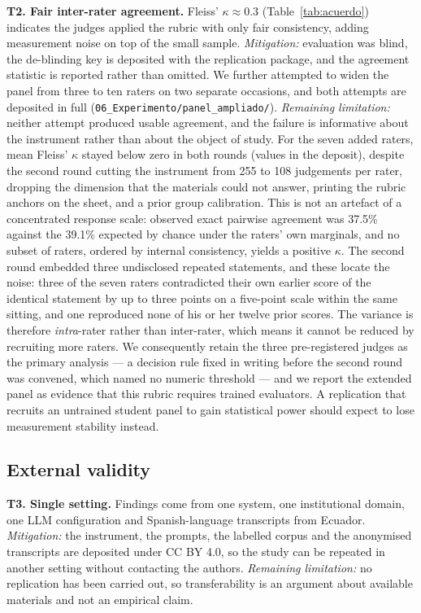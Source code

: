\documentclass{llncs}
\begin{document}
\textbf{T2. Fair inter-rater agreement.} Fleiss' $\kappa \approx 0.3$
(Table~\ref{tab:acuerdo}) indicates the judges applied the rubric with only fair
consistency, adding measurement noise on top of the small sample.
\emph{Mitigation:} evaluation was blind, the de-blinding key is deposited with
the replication package, and the agreement statistic is reported rather than
omitted. We further attempted to widen the panel from three to ten raters on two
separate occasions, and both attempts are deposited in full
(\nolinkurl{06_Experimento/panel_ampliado/}). \emph{Remaining limitation:} neither
attempt produced usable agreement, and the failure is informative about the
instrument rather than about the object of study. For the seven added raters,
mean Fleiss' $\kappa$ stayed below zero in both rounds (values in the deposit),
despite the second round cutting the instrument from 255
to 108 judgements per rater, dropping the dimension that the materials could not
answer, printing the rubric anchors on the sheet, and a prior group calibration. This is not an artefact of a concentrated response
scale: observed exact pairwise agreement was 37.5\% against the 39.1\% expected
by chance under the raters' own marginals, and no subset of raters, ordered by
internal consistency, yields a positive $\kappa$. The second round embedded three
undisclosed repeated statements, and these locate the noise: three of the seven
raters contradicted their own earlier score of the identical statement by up to
three points on a five-point scale within the same sitting, and one reproduced
none of his or her twelve prior scores. The variance is therefore
\emph{intra}-rater rather than inter-rater, which means it cannot be reduced by
recruiting more raters. We consequently retain the three pre-registered judges as
the primary analysis --- a decision rule fixed in writing before the second round
was convened, which named no numeric threshold --- and we report the
extended panel as evidence that this rubric requires trained evaluators. A
replication that recruits an untrained student panel to gain statistical power
should expect to lose measurement stability instead.

\subsection{External validity}

\textbf{T3. Single setting.} Findings come from one system, one institutional
domain, one LLM configuration and Spanish-language transcripts from Ecuador.
\emph{Mitigation:} the instrument, the prompts, the labelled corpus and the
anonymised transcripts are deposited under CC BY 4.0, so the study can be
repeated in another setting without contacting the authors.
\emph{Remaining limitation:} no replication has been carried out, so
transferability is an argument about available materials and not an empirical
claim.
\end{document}
